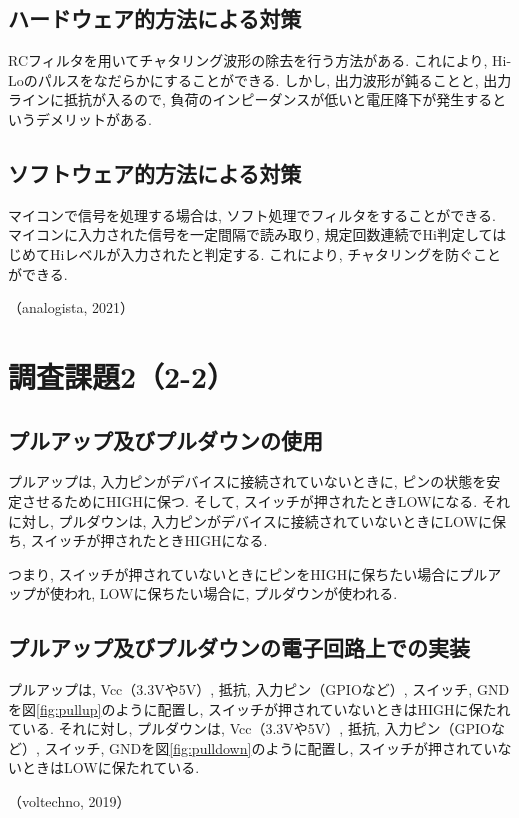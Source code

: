 \documentclass{ltjsarticle} %
\begin{document}
\subsection{ハードウェア的⽅法による対策}
RCフィルタを用いてチャタリング波形の除去を行う方法がある. これにより, Hi-Loのパルスをなだらかにすることができる. 
しかし, 出力波形が鈍ることと, 出力ラインに抵抗が入るので, 負荷のインピーダンスが低いと電圧降下が発生するというデメリットがある. 


\subsection{ソフトウェア的⽅法による対策}
マイコンで信号を処理する場合は, ソフト処理でフィルタをすることができる. 
マイコンに入力された信号を一定間隔で読み取り, 規定回数連続でHi判定してはじめてHiレベルが入力されたと判定する. 
これにより, チャタリングを防ぐことができる. 

（analogista, 2021）



\section{調査課題2（2-2）}

\subsection{プルアップ及びプルダウンの使用}
プルアップは, 入力ピンがデバイスに接続されていないときに, ピンの状態を安定させるためにHIGHに保つ. 
そして, スイッチが押されたときLOWになる.  
それに対し, プルダウンは, 入力ピンがデバイスに接続されていないときにLOWに保ち, 
スイッチが押されたときHIGHになる. 

つまり, スイッチが押されていないときにピンをHIGHに保ちたい場合にプルアップが使われ, 
LOWに保ちたい場合に, プルダウンが使われる. 


\subsection{プルアップ及びプルダウンの電⼦回路上での実装}
プルアップは, Vcc（3.3Vや5V）, 抵抗, 入力ピン（GPIOなど）, スイッチ, GNDを図\ref{fig:pullup}のように配置し, 
スイッチが押されていないときはHIGHに保たれている. 
それに対し, プルダウンは, Vcc（3.3Vや5V）, 抵抗, 入力ピン（GPIOなど）, スイッチ, GNDを図\ref{fig:pulldown}のように配置し, 
スイッチが押されていないときはLOWに保たれている. 

（voltechno, 2019）
\end{document}
